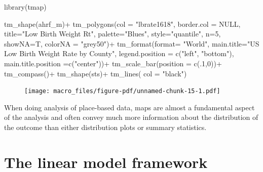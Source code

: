 \documentclass[
  letterpaper,
  DIV=11,
  numbers=noendperiod]{scrreprt}
\newenvironment{Shaded}{\begin{snugshade}}{\end{snugshade}}
\newcommand{\AttributeTok}[1]{\textcolor[rgb]{0.40,0.45,0.13}{#1}}
\newcommand{\ConstantTok}[1]{\textcolor[rgb]{0.56,0.35,0.01}{#1}}
\newcommand{\DecValTok}[1]{\textcolor[rgb]{0.68,0.00,0.00}{#1}}
\newcommand{\FunctionTok}[1]{\textcolor[rgb]{0.28,0.35,0.67}{#1}}
\newcommand{\NormalTok}[1]{\textcolor[rgb]{0.00,0.23,0.31}{#1}}
\newcommand{\SpecialCharTok}[1]{\textcolor[rgb]{0.37,0.37,0.37}{#1}}
\newcommand{\StringTok}[1]{\textcolor[rgb]{0.13,0.47,0.30}{#1}}
\begin{document}
\begin{Shaded}
\begin{Highlighting}[]
\FunctionTok{library}\NormalTok{(tmap)}

\FunctionTok{tm\_shape}\NormalTok{(ahrf\_m)}\SpecialCharTok{+}
  \FunctionTok{tm\_polygons}\NormalTok{(}\AttributeTok{col =} \StringTok{"lbrate1618"}\NormalTok{,}
              \AttributeTok{border.col =} \ConstantTok{NULL}\NormalTok{,}
              \AttributeTok{title=}\StringTok{"Low Birth Weight Rt"}\NormalTok{,}
              \AttributeTok{palette=}\StringTok{"Blues"}\NormalTok{,}
              \AttributeTok{style=}\StringTok{"quantile"}\NormalTok{,}
              \AttributeTok{n=}\DecValTok{5}\NormalTok{,}
              \AttributeTok{showNA=}\NormalTok{T, }\AttributeTok{colorNA =} \StringTok{"grey50"}\NormalTok{)}\SpecialCharTok{+}
   \FunctionTok{tm\_format}\NormalTok{(}\AttributeTok{format=} \StringTok{"World"}\NormalTok{,}
             \AttributeTok{main.title=}\StringTok{"US Low Birth Weight Rate by County"}\NormalTok{,}
            \AttributeTok{legend.position =}  \FunctionTok{c}\NormalTok{(}\StringTok{"left"}\NormalTok{, }\StringTok{"bottom"}\NormalTok{),}
            \AttributeTok{main.title.position =}\FunctionTok{c}\NormalTok{(}\StringTok{"center"}\NormalTok{))}\SpecialCharTok{+}
  \FunctionTok{tm\_scale\_bar}\NormalTok{(}\AttributeTok{position =} \FunctionTok{c}\NormalTok{(.}\DecValTok{1}\NormalTok{,}\DecValTok{0}\NormalTok{))}\SpecialCharTok{+}
  \FunctionTok{tm\_compass}\NormalTok{()}\SpecialCharTok{+}
\FunctionTok{tm\_shape}\NormalTok{(sts)}\SpecialCharTok{+}
  \FunctionTok{tm\_lines}\NormalTok{( }\AttributeTok{col =} \StringTok{"black"}\NormalTok{)}
\end{Highlighting}
\end{Shaded}

\begin{figure}[H]

{\centering \texttt{[image: macro\_files/figure-pdf/unnamed-chunk-15-1.pdf]}

}

\end{figure}

When doing analysis of place-based data, maps are almost a fundamental
aspect of the analysis and often convey much more information about the
distribution of the outcome than either distribution plots or summary
statistics.

\hypertarget{the-linear-model-framework}{%
\section{The linear model framework}\label{the-linear-model-framework}}
\end{document}
